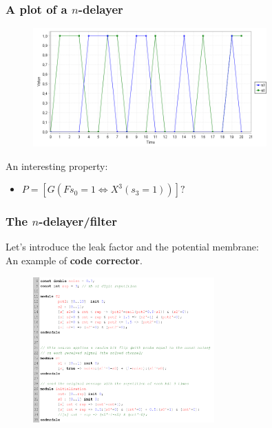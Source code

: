\begin{frame}
  \frametitle{A plot of a $n$-delayer}

  \begin{figure}
    \includegraphics[width=0.8\textwidth]{pic/simple_serie1_plot.png}
  \end{figure}

  \mysep{}

  An interesting property:
  \begin{itemize}
    \item $P = [G (F s_0 = 1 \Leftrightarrow X^3 (s_3=1))] ? $ 
  \end{itemize}

\end{frame}

\begin{frame}
  \frametitle{The $n$-delayer/filter}

  Let's introduce the leak factor and the potential membrane:\\ An example of \textbf{code corrector}.

  \begin{figure}
    \includegraphics[width=0.62\textwidth]{pic/simple_serie_corr_code.png}
  \end{figure}

\end{frame}


